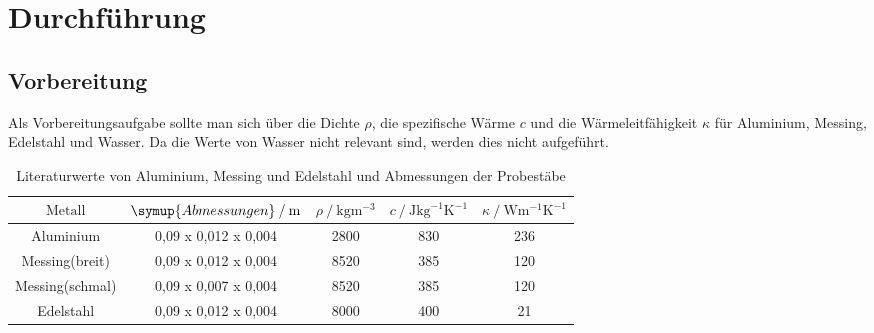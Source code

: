 \section{Durchführung}
\label{sec:Durchführung}
\subsection{Vorbereitung}
Als Vorbereitungsaufgabe sollte man sich über die Dichte $\rho$, die spezifische Wärme $c$ und die Wärmeleitfähigkeit $\kappa$ für 
Aluminium, Messing, Edelstahl und Wasser. Da die Werte von Wasser nicht relevant sind, werden dies nicht aufgeführt.
\begin{table}
    \centering
    \caption{Literaturwerte von Aluminium, Messing und Edelstahl und Abmessungen der Probestäbe}
    \label{tab:litwerte}
    \begin{tabular}{c c c c c}
        \toprule
        $\text{Metall}$ & $\symup{Abmessungen} \mathbin{/} \si{\meter}$ &$\rho \mathbin{/} \si{\kilogram\meter\tothe{-3}}$ 
        & $c \mathbin{/} \si{\joule\kilogram\tothe{-1}\kelvin\tothe{-1}}$ & $\kappa \mathbin{/} \si{\watt\meter\tothe{-1}\kelvin\tothe{-1}}$\\
        \midrule
        Aluminium & 0,09 x 0,012 x 0,004 & 2800 & 830 & 236 \\
        Messing(breit)   &  0,09 x 0,012 x 0,004 &8520 & 385 & 120 \\
        Messing(schmal)   & 0,09 x 0,007 x 0,004 &8520 & 385 & 120 \\
        Edelstahl &0,09 x 0,012 x 0,004  &8000 & 400 & 21  \\
        \bottomrule
    \end{tabular}
\end{table}
